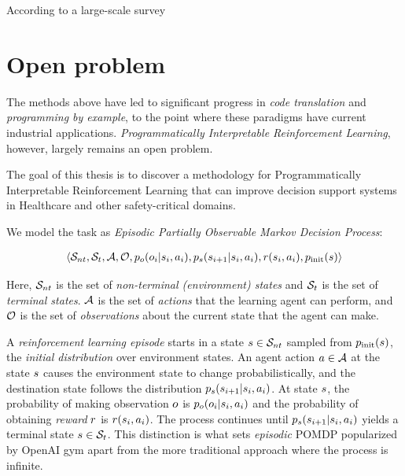 According to a large-scale survey \cite{liangLargeScaleSurveyUsability2024} 

\newpage
\section{Open problem}

The methods above have led to significant progress in \emph{code translation} and \emph{programming by example}, to the point where these paradigms have current industrial applications.
\emph{Programmatically Interpretable Reinforcement Learning}, however, largely remains an open problem.

\begin{highlight}
The goal of this thesis is to discover a methodology for Programmatically Interpretable Reinforcement Learning that can improve decision support systems in Healthcare and other safety-critical domains.
\end{highlight}


We model the task as {\em Episodic Partially Observable Markov Decision Process}:

\begin{multline}
\langle \mathcal{S}_{nt}, \mathcal{S}_t, \mathcal{A}, \mathcal{O}, p_o(o_i | s_i, a_i), p_s(s_{i+1} | s_i, a_i), r(s_i,a_i), p_\text{init}(s) \rangle
\end{multline}

Here, $\mathcal{S}_{nt}$ is the set of {\em non-terminal (environment) states} and $\mathcal{S}_t$ is the set of {\em terminal states}. 
$\mathcal{A}$ is the set of {\em actions} that the learning agent can perform, and $\mathcal{O}$ is the set of {\em observations} about the current state that the agent can make. 

A \emph{reinforcement learning episode} starts in a state $s \in \mathcal{S}_{nt}$ sampled from $p_\text{init}(s)$, the {\em initial distribution} over environment states.
An agent action $a \in \mathcal{A}$ at the state $s$ causes the environment state to change probabilistically, and the destination state follows the distribution $p_s(s_{i+1} | s_i, a_i)$. 
At state $s$, the probability of making observation $o$ is $p_o(o_i | s_i, a_i)$ and the probability of obtaining \emph{reward} $r$ is $r(s_i,a_i)$. 
The process continues until $p_s(s_{i+1} | s_i, a_i)$ yields a terminal state $s \in \mathcal{S}_t$.
This distinction is what sets \emph{episodic} POMDP popularized by OpenAI gym \cite{openai-gym} apart from the more traditional approach \cite{kramerjdavidrPartiallyObservableMarkov1964, spaanPartiallyObservableMarkov2012} where the process is infinite.

